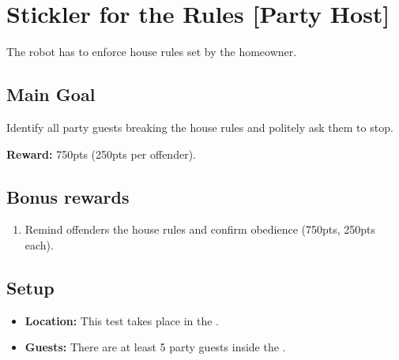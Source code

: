 \section{Stickler for the Rules [Party Host]}
\label{test:stickler-for-the-rules}
The robot has to enforce house rules set by the homeowner.


\subsection*{Main Goal}
Identify all party guests breaking the house rules and politely ask them to stop.

\noindent\textbf{Reward:} 750pts (250pts per offender).

\subsection*{Bonus rewards}
\begin{enumerate}[nosep]
	\item Remind offenders the house rules and confirm obedience (750pts, 250pts each).
\end{enumerate}

\subsection*{Setup}
\begin{itemize}[nosep]
	\item \textbf{Location:} This test takes place in the \Arena{}.
	\item \textbf{Guests:} There are at least 5 party guests inside the \Arena{}.
\end{itemize}


